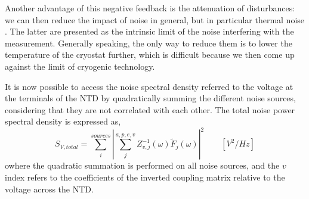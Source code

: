 Another advantage of this negative feedback is the attenuation of disturbances: we can then reduce the impact of noise in general, but in particular thermal noise \cite{mather}. The latter are presented as the intrinsic limit of the noise interfering with the measurement. Generally speaking, the only way to reduce them is to lower the temperature of the cryostat further, which is difficult because we then come up against the limit of cryogenic technology.

It is now possible to access the noise spectral density referred to the voltage at the terminals of the NTD by quadratically summing the different noise sources, considering that they are not correlated with each other. The total noise power spectral density is expressed as,
\begin{equation}
\label{psd-total}
S_{V,total} = \sum_i^{sources} \left\vert \sum_j^{a,p,e,v} Z_{v,j}^{-1} (\omega) \tilde{F}_j(\omega) \right\vert^2 \qquad [V^2/Hz]
\end{equation}
owhere the quadratic summation is performed on all noise sources, and the $v$ index refers to the coefficients of the inverted coupling matrix relative to the voltage across the NTD.

